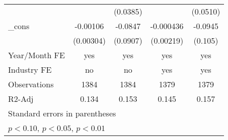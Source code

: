 \begin{table}[htbp]
\begin{tabular}{l*{4}{c}}
                &                  & (0.0385)         &                  & (0.0510)         \\
\_cons          & -0.00106         &  -0.0847         &-0.000436         &  -0.0945         \\
                &(0.00304)         & (0.0907)         &(0.00219)         &  (0.105)         \\
\hline
Year/Month FE   &      yes         &      yes         &      yes         &      yes         \\
Industry FE     &       no         &       no         &      yes         &      yes         \\
Observations    &     1384         &     1384         &     1379         &     1379         \\
R2-Adj          &    0.134         &    0.153         &    0.145         &    0.157         \\
\hline\hline
\multicolumn{5}{l}{\footnotesize Standard errors in parentheses}\\
\multicolumn{5}{l}{\footnotesize \sym{*} \(p<0.10\), \sym{**} \(p<0.05\), \sym{***} \(p<0.01\)}\\
\end{tabular}
\end{table}
